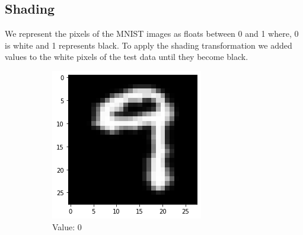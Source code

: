 \subsection{Shading}
We represent the pixels of the MNIST images as floats between 0 and 1 where, 0 is white and 1 represents black. To apply the shading transformation we added values to the white pixels of the test data until they become black.
    \begin{figure}[htb!]
        \centering
        \begin{subfigure}[b]{.3\textwidth}
            \centering
            \includegraphics[width=\linewidth]{images/shade1.png}
            \caption{Value: 0}
            \label{fig:Rotate-misclass0}
        \end{subfigure}%
        \begin{subfigure}[b]{.3\textwidth}
            \centering

\end{subfigure}
\end{figure}
